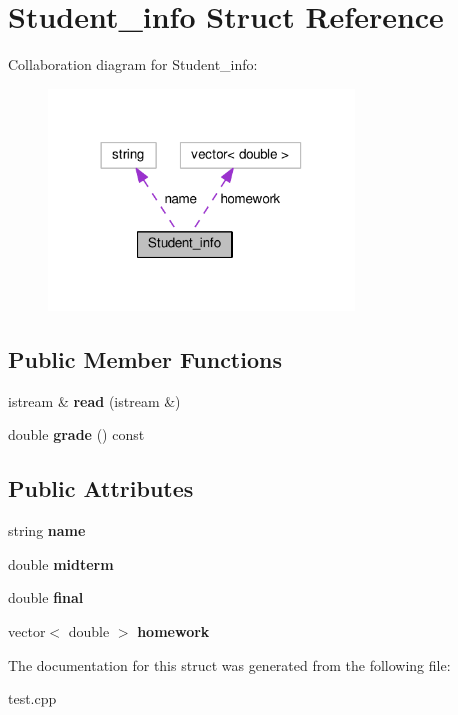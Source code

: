 \hypertarget{structStudent__info}{}\section{Student\+\_\+info Struct Reference}
\label{structStudent__info}


Collaboration diagram for Student\+\_\+info\+:
\nopagebreak
\begin{figure}[H]
\begin{center}
\leavevmode
\includegraphics[width=230pt]{structStudent__info__coll__graph}
\end{center}
\end{figure}
\subsection*{Public Member Functions}
\begin{DoxyCompactItemize}
\item 
\mbox{\label{structStudent__info_a901ae6c3186500560ced59cbafd7b636}} 
istream \& {\bfseries read} (istream \&)
\item 
\mbox{\label{structStudent__info_aa747a026fde190bcf679e57a492060b4}} 
double {\bfseries grade} () const
\end{DoxyCompactItemize}
\subsection*{Public Attributes}
\begin{DoxyCompactItemize}
\item 
\mbox{\label{structStudent__info_a19287a7a6a87509a1b7b34543bce60a3}} 
string {\bfseries name}
\item 
\mbox{\label{structStudent__info_ab801ac167af77a726a03e16ecc99443e}} 
double {\bfseries midterm}
\item 
\mbox{\label{structStudent__info_a94a0dc8086fbe733ff2021e2879cc8d5}} 
double {\bfseries final}
\item 
\mbox{\label{structStudent__info_a01cca6c455c1f9f7da7df7385a049193}} 
vector$<$ double $>$ {\bfseries homework}
\end{DoxyCompactItemize}


The documentation for this struct was generated from the following file\+:\begin{DoxyCompactItemize}
\item 
test.\+cpp\end{DoxyCompactItemize}
